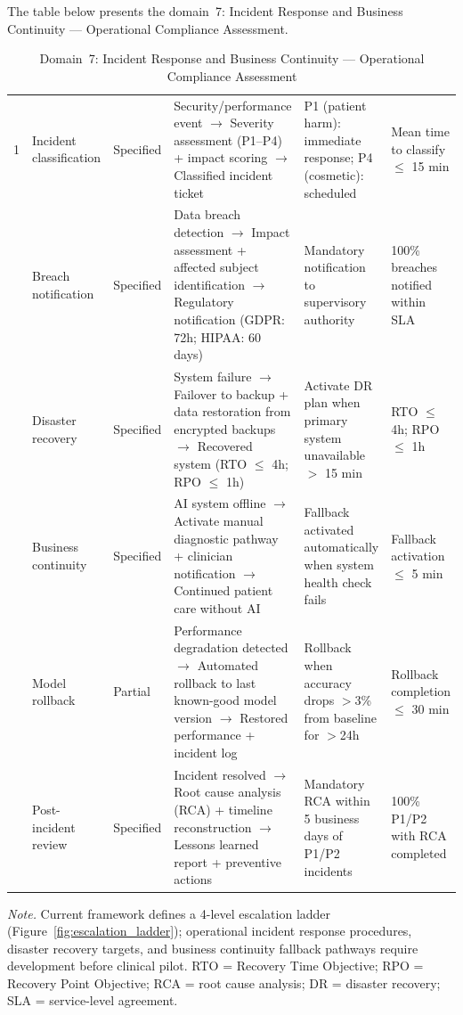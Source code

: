 \noindent The table below presents the domain~7: Incident Response and Business Continuity --- Operational Compliance Assessment.

\begin{table}[H]
\tablestripes
\tablefontsize
\caption[Incident Response and Business Continuity Assessment]{Domain~7: Incident Response and Business Continuity --- Operational Compliance Assessment}
\begin{tabularx}{\textwidth}{@{} p{0.4cm} p{2cm} p{1.4cm} L L p{1.8cm} @{}}
\toprule
\thead{\#} &  &  &  &  &  \\
 & Incident classification & Specified & Security/performance event $\to$ Severity assessment (P1--P4) + impact scoring $\to$ Classified incident ticket & P1 (patient harm): immediate response; P4 (cosmetic): scheduled & Mean time to classify $\leq$ 15 min \\
 & Breach notification & Specified & Data breach detection $\to$ Impact assessment + affected subject identification $\to$ Regulatory notification (GDPR: 72h; HIPAA: 60 days) & Mandatory notification to supervisory authority & 100\% breaches notified within SLA \\
 & Disaster recovery & Specified & System failure $\to$ Failover to backup + data restoration from encrypted backups $\to$ Recovered system (RTO $\leq$ 4h; RPO $\leq$ 1h) & Activate DR plan when primary system unavailable $>$ 15 min & RTO $\leq$ 4h; RPO $\leq$ 1h \\
 & Business continuity & Specified & AI system offline $\to$ Activate manual diagnostic pathway + clinician notification $\to$ Continued patient care without AI & Fallback activated automatically when system health check fails & Fallback activation $\leq$ 5 min \\
 & Model rollback & Partial & Performance degradation detected $\to$ Automated rollback to last known-good model version $\to$ Restored performance + incident log & Rollback when accuracy drops $>$3\% from baseline for $>$24h & Rollback completion $\leq$ 30 min \\
 & Post-incident review & Specified & Incident resolved $\to$ Root cause analysis (RCA) + timeline reconstruction $\to$ Lessons learned report + preventive actions & Mandatory RCA within 5 business days of P1/P2 incidents & 100\% P1/P2 with RCA completed \\
\bottomrule
\end{tabularx}
\vspace{0.5em}\noindent\textit{Note.} Current framework defines a 4-level escalation ladder (Figure~\ref{fig:escalation_ladder}); operational incident response procedures, disaster recovery targets, and business continuity fallback pathways require development before clinical pilot. RTO = Recovery Time Objective; RPO = Recovery Point Objective; RCA = root cause analysis; DR = disaster recovery; SLA = service-level agreement.
\end{table}

